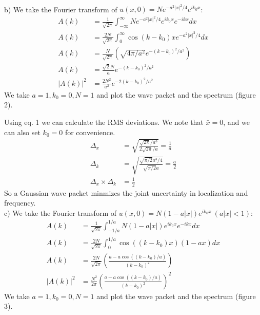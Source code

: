 \documentclass[a4paper,11pt]{article}
\numberwithin{equation}{section}
\newcommand{\lrp}[1]{\left({#1}\right)}
\begin{document}
\\
b) We take the Fourier transform of $u(x,0) = Ne^{-a^2|x|^2/4}e^{ik_0x}$:
\begin{align}
 A(k) &= \frac{1}{\sqrt{2\pi}}\int_{-\infty}^\infty Ne^{-a^2|x|^2/4}e^{ik_0x}e^{-ikx}dx\\
 A(k) &= \frac{2N}{\sqrt{2\pi}}\int_{0}^\infty \cos{(k-k_0)x} e^{-a^2|x|^2/4} dx\\
 A(k) &= \frac{N}{\sqrt{2\pi}}\lrp{\sqrt{4\pi/a^2}e^{-(k-k_0)^2/a^2}}\\
 A(k) &= \frac{\sqrt{2}N}{a}e^{-(k-k_0)^2/a^2}\\
 |A(k)|^2 &= \frac{2N^2}{a^2}e^{-2(k-k_0)^2/a^2}
\end{align}
We take $a=1, k_0=0, N=1$ and plot the wave packet and the spectrum (figure 2).

Using eq. 1 we can calculate the RMS deviations.
We note that $\bar{x}=0$, and we can also set $k_0=0$ for convenience.
\begin{align}
 \Delta_x &= \sqrt{\frac{\sqrt{2\pi}/a^3}{2\sqrt{2\pi}/a}} = \frac{1}{a}\\
 \Delta_k &= \sqrt{\frac{\sqrt{\pi/2}a^3/4}{\sqrt{\pi/2}a}} = \frac{a}{2}\\
 \Delta_x \times \Delta_k &= \frac{1}{2}
\end{align}
So a Gaussian wave packet minmizes the joint uncertainty in localization and frequency.
\\
c) We take the Fourier transform of $u(x,0) = N(1-a|x|)e^{ik_0x}\ (a|x|<1)$:
\begin{align}
 A(k) &= \frac{1}{\sqrt{2\pi}}\int_{-1/a}^{1/a} N(1-a|x|)e^{ik_0x}e^{-ikx}dx\\
 A(k) &= \frac{2N}{\sqrt{2\pi}}\int_{0}^{1/a} \cos{((k-k_0)x)} (1-ax) dx\\
 A(k) &= \frac{2N}{\sqrt{2\pi}}\lrp{\frac{a-a\cos{((k-k_0)/a)}}{(k-k_0)^2}}\\
 |A(k)|^2 &= \frac{N^2}{2\pi}\lrp{\frac{a-a\cos{((k-k_0)/a)}}{(k-k_0)^2}}^2
\end{align}
We take $a=1, k_0=0, N=1$ and plot the wave packet and the spectrum (figure 3).
\end{document}
